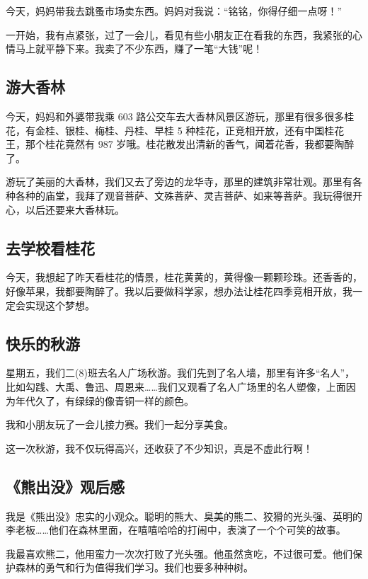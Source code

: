 \documentclass[UTF8,a4paper,titlepage,twoside,10.5pt]{article}
\begin{document}
今天，妈妈带我去跳蚤市场卖东西。妈妈对我说：“铭铭，你得仔细一点呀！”

一开始，我有点紧张，过了一会儿，看见有些小朋友正在看我的东西，我紧张的心情马上就平静下来。我卖了不少东西，赚了一笔“大钱”呢！

\subsection{游大香林}
\label{sec:org8f0fd2c}

今天，妈妈和外婆带我乘 603 路公交车去大香林风景区游玩，那里有很多很多桂花，有金桂、银桂、梅桂、丹桂、早桂 5 种桂花，正竞相开放，还有中国桂花王，那个桂花竟然有 987 岁哦。桂花散发出清新的香气，闻着花香，我都要陶醉了。

游玩了美丽的大香林，我们又去了旁边的龙华寺，那里的建筑非常壮观。那里有各种各种的庙堂，我拜了观音菩萨、文殊菩萨、灵吉菩萨、如来等菩萨。我玩得很开心，以后还要来大香林玩。

\subsection{去学校看桂花}
\label{sec:orge27236a}

今天，我想起了昨天看桂花的情景，桂花黄黄的，黄得像一颗颗珍珠。还香香的，好像苹果，我都要陶醉了。我以后要做科学家，想办法让桂花四季竞相开放，我一定会实现这个梦想。

\subsection{快乐的秋游}
\label{sec:org56be1ca}

星期五，我们二(8)班去名人广场秋游。我们先到了名人墙，那里有许多“名人”，比如勾践、大禹、鲁迅、周恩来……我们又观看了名人广场里的名人塑像，上面因为年代久了，有绿绿的像青铜一样的颜色。

我和小朋友玩了一会儿接力赛。我们一起分享美食。

这一次秋游，我不仅玩得高兴，还收获了不少知识，真是不虚此行啊！

\subsection{《熊出没》观后感}
\label{sec:org0cf5407}

我是《熊出没》忠实的小观众。聪明的熊大、臭美的熊二、狡猾的光头强、英明的李老板……他们在森林里面，在嘻嘻哈哈的打闹中，表演了一个个可笑的故事。

我最喜欢熊二，他用蛮力一次次打败了光头强。他虽然贪吃，不过很可爱。他们保护森林的勇气和行为值得我们学习。我们也要多种种树。
\end{document}
